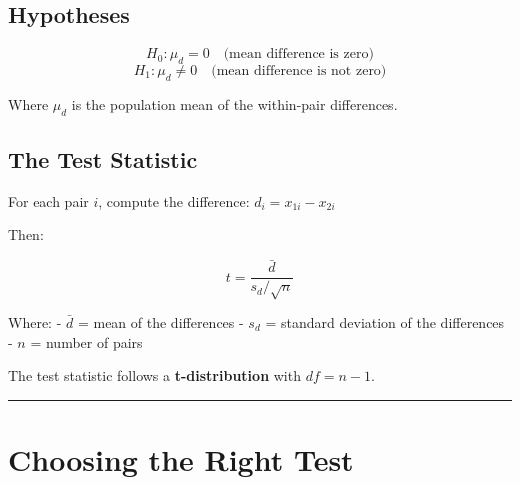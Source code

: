 \documentclass[
  12pt,
  letterpaper,
]{book}
\begin{document}
\subsection{Hypotheses}\label{hypotheses-1}

\[H_0: \mu_d = 0 \quad \text{(mean difference is zero)}\]
\[H_1: \mu_d \neq 0 \quad \text{(mean difference is not zero)}\]

Where \(\mu_d\) is the population mean of the within-pair differences.

\subsection{The Test Statistic}\label{the-test-statistic-2}

For each pair \(i\), compute the difference: \(d_i = x_{1i} - x_{2i}\)

Then:

\[t = \frac{\bar{d}}{s_d / \sqrt{n}}\]

Where: - \(\bar{d}\) = mean of the differences - \(s_d\) = standard
deviation of the differences - \(n\) = number of pairs

The test statistic follows a \textbf{t-distribution} with
\(df = n - 1\).

\begin{center}\rule{0.5\linewidth}{0.5pt}\end{center}

\section{Choosing the Right Test}\label{choosing-the-right-test}
\end{document}
